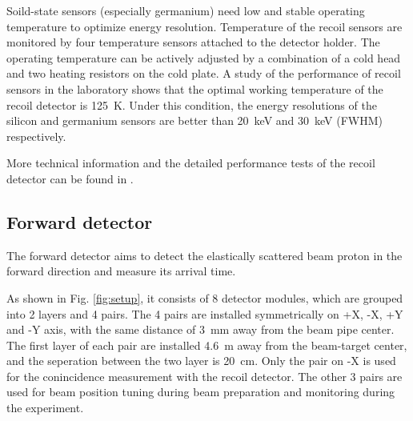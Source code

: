 \documentclass[number,5p]{elsarticle}
\begin{document}
Soild-state sensors (especially germanium) need low and stable operating temperature to optimize energy
resolution.
Temperature of the recoil sensors are monitored by four temperature sensors
attached to the detector holder.
The operating temperature can be actively adjusted by a combination of a cold head and two heating resistors on the cold plate.
A study of the performance of recoil sensors in the laboratory shows that the
optimal working temperature of the recoil detector is \SI{125}{\kelvin}.
Under this condition, the energy resolutions of the silicon and germanium
sensors are better than \SI{20}{\keV} and \SI{30}{\keV} (FWHM) respectively.

More technical information and the detailed performance tests of the recoil detector can be found in \cite{recoil_article}.

\subsection{Forward detector}
\label{sec:fwd}

The forward detector aims to detect the elastically scattered beam proton in the
forward direction and measure its arrival time.

As shown in Fig. \ref{fig:setup}, it consists of 8 detector modules, which are grouped into 2 layers and 4 pairs.
The 4 pairs are installed symmetrically on +X, -X, +Y and -Y axis, with the same
distance of \SI{3}{\mm} away from the beam pipe center.
The first layer of each pair are installed \SI{4.6}{\meter} away from the
beam-target center, and the seperation between the two layer is \SI{20}{\cm}.
Only the pair on -X is used for the conincidence measurement with the recoil detector.
The other 3 pairs are used for beam position tuning during beam preparation and
monitoring during the experiment.
\end{document}
